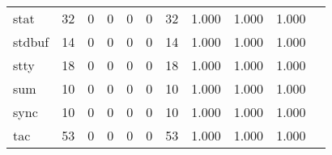 \begin{longtable}{lp{1.2cm}p{1.2cm}p{1.2cm}p{1.2cm}p{1.2cm}p{1.2cm}p{1.2cm}p{1.2cm}p{1.2cm}p{1.2cm}}
stat      &                                    32 &                                                  0 &                                                  0 &                                                  0 &                                                  0 &                                                 32 &                                         1.000 &                                              1.000 &                                              1.000 \\
stdbuf    &                                    14 &                                                  0 &                                                  0 &                                                  0 &                                                  0 &                                                 14 &                                         1.000 &                                              1.000 &                                              1.000 \\
stty      &                                    18 &                                                  0 &                                                  0 &                                                  0 &                                                  0 &                                                 18 &                                         1.000 &                                              1.000 &                                              1.000 \\
sum       &                                    10 &                                                  0 &                                                  0 &                                                  0 &                                                  0 &                                                 10 &                                         1.000 &                                              1.000 &                                              1.000 \\
sync      &                                    10 &                                                  0 &                                                  0 &                                                  0 &                                                  0 &                                                 10 &                                         1.000 &                                              1.000 &                                              1.000 \\
tac       &                                    53 &                                                  0 &                                                  0 &                                                  0 &                                                  0 &                                                 53 &                                         1.000 &                                              1.000 &                                              1.000 \\

\end{longtable}
